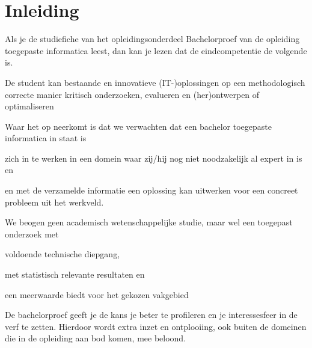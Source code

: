 \chapter{Inleiding}
\label{sec:inleiding}


%
%
%
%
%
%

Als je de studiefiche van het opleidingsonderdeel Bachelorproef van de opleiding toegepaste informatica leest, dan kan je lezen dat de eindcompetentie de volgende is.

\begin{framed}
\begin{center}
	De student kan bestaande en innovatieve (IT-)oplossingen op een methodologisch correcte manier kritisch onderzoeken, evalueren en (her)ontwerpen of optimaliseren
\end{center}
\end{framed}


Waar het op neerkomt is dat we verwachten dat een bachelor toegepaste informatica in staat is 
\begin{inparaenum}[(i)]
	\item zich in te werken in een domein waar zij/hij nog niet noodzakelijk al expert in is en 
	\item en met de verzamelde informatie een oplossing kan uitwerken voor een concreet probleem uit het werkveld.
\end{inparaenum}

We beogen geen academisch wetenschappelijke studie, maar wel een toegepast onderzoek met
\begin{inparaenum}[(i)]
	\item voldoende technische diepgang,
	\item met statistisch relevante resultaten en
	\item een meerwaarde biedt voor het gekozen vakgebied
\end{inparaenum}

De bachelorproef geeft je de kans je beter te profileren en je interessesfeer in de verf te zetten.  Hierdoor wordt extra inzet en ontplooiing, ook buiten de domeinen die in de opleiding aan bod komen, mee beloond.

